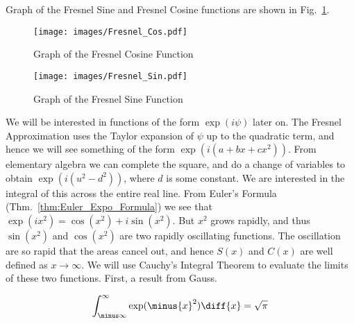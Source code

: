         Graph of the Fresnel Sine and Fresnel Cosine functions are shown in
        Fig.~\ref{fig:Graph_Fresnel_Cos}.
        \begin{figure}[H]
            \centering
            \captionsetup{type=figure}
            \texttt{[image: images/Fresnel\_Cos.pdf]}
            \caption{Graph of the Fresnel Cosine Function}
            \label{fig:Graph_Fresnel_Cos}
        \end{figure}
        \begin{figure}[H]
            \centering
            \captionsetup{type=figure}
            \texttt{[image: images/Fresnel\_Sin.pdf]}
            \caption{Graph of the Fresnel Sine Function}
        \end{figure}
        We will be interested in functions of the form $\exp(i\psi)$ later on.
        The Fresnel Approximation uses the Taylor expansion of $\psi$ up to the
        quadratic term, and hence we will see something of the form
        $\exp(i(a+bx+cx^2))$. From elementary algebra we can complete the
        square, and do a change of variables to obtain $\exp(i(u^{2}-d^{2}))$,
        where $d$ is some constant. We are interested in the integral of this
        across the entire real line. From Euler's Formula
        (Thm.~\ref{thm:Euler_Expo_Formula}) we see that
        $\exp(ix^{2})=\cos(x^{2})+i\sin(x^{2})$. But $x^{2}$ grows rapidly, and
        thus $\sin(x^{2})$ and $\cos(x^{2})$ are two rapidly oscillating
        functions. The oscillation are so rapid that the areas cancel out, and
        hence $S(x)$ and $C(x)$ are well defined as $x\rightarrow\infty$. We
        will use Cauchy's Integral Theorem to evaluate the limits of these two
        functions. First, a result from Gauss.
        \begin{theorem}
            \begin{equation}
                \int_{\minus\infty}^{\infty}
                    \exp(\minus{x}^{2})\diff{x}
                =\sqrt{\pi}
            \end{equation}
        \end{theorem}
